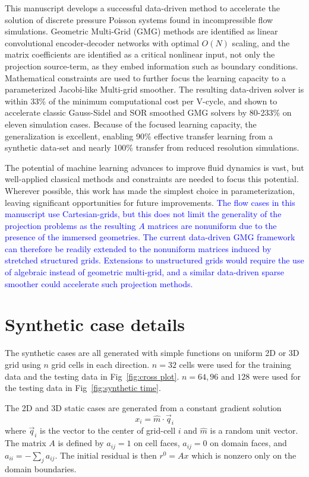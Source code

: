 \documentclass[review]{elsarticle}
\begin{document}
This manuscript develops a successful data-driven method to accelerate the solution of discrete pressure Poisson systems found in incompressible flow simulations. Geometric Multi-Grid (GMG) methods are identified as linear convolutional encoder-decoder networks with optimal $O(N)$ scaling, and the matrix coefficients are identified as a critical nonlinear input, not only the projection source-term, as they embed information such as boundary conditions. Mathematical constraints are used to further focus the learning capacity to a parameterized Jacobi-like Multi-grid smoother. The resulting data-driven solver is within 33\% of the minimum computational cost per V-cycle, and shown to accelerate classic Gauss-Sidel and SOR smoothed GMG solvers by 80-233\% on eleven simulation cases. Because of the focused learning capacity, the generalization is excellent, enabling 90\% effective transfer learning from a synthetic data-set and nearly 100\% transfer from reduced resolution simulations.

The potential of machine learning advances to improve fluid dynamics is vast, but well-applied classical methods and constraints are needed to focus this potential. Wherever possible, this work has made the simplest choice in parameterization, leaving significant opportunities for future improvements. \textcolor{blue}{The flow cases in this manuscript use Cartesian-grids, but this does not limit the generality of the projection problems as the resulting $A$ matrices are nonuniform due to the presence of the immersed geometries. The current data-driven GMG framework can therefore be readily extended to the nonuniform matrices induced by stretched structured grids. Extensions to unstructured grids would require the use of algebraic instead of geometric multi-grid, and a similar data-driven sparse smoother could accelerate such projection methods.}


\color{blue}
\appendix
\section{Synthetic case details}\label{app synth}

The synthetic cases are all generated with simple functions on uniform 2D or 3D grid using $n$ grid cells in each direction. $n=32$ cells were used for the training data and the testing data in Fig~\ref{fig:cross plot}. $n=64,96$ and $128$ were used for the testing data in Fig~\ref{fig:synthetic time}.

The 2D and 3D static cases are generated from a constant gradient solution
$$ x_i = \hat m \cdot \vec q_i$$
where $\vec q_i$ is the vector to the center of grid-cell $i$ and $\hat m$ is a random unit vector. The matrix $A$ is defined by $a_{ij}=1$ on cell faces, $a_{ij}=0$ on domain faces, and $a_{ii}=-\sum_j a_{ij}$. The initial residual is then $r^0=A x$ which is nonzero only on the domain boundaries.
\end{document}
